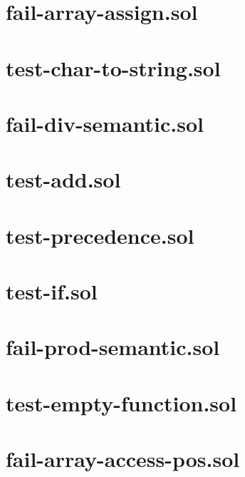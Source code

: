 \section{fail-array-assign.sol}


\section{test-char-to-string.sol}


\section{fail-div-semantic.sol}


\section{test-add.sol}


\section{test-precedence.sol}


\section{test-if.sol}


\section{fail-prod-semantic.sol}


\section{test-empty-function.sol}


\section{fail-array-access-pos.sol}



